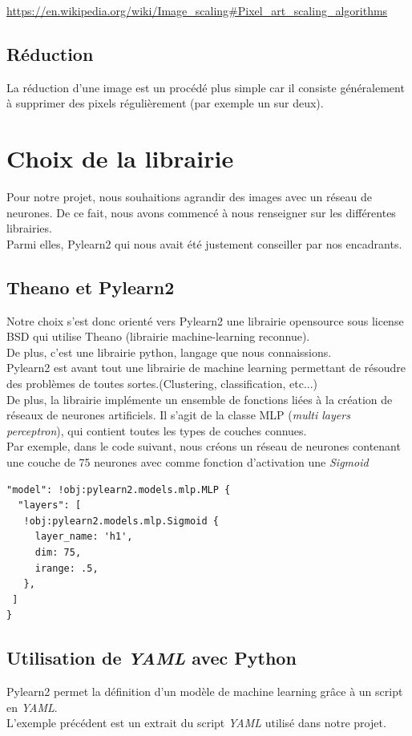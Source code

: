 \documentclass[12pt, a4paper]{article}
\begin{document}
\url{https://en.wikipedia.org/wiki/Image_scaling#Pixel_art_scaling_algorithms}

\subsection{Réduction}

La réduction d'une image est un procédé plus simple car il consiste généralement à supprimer des pixels régulièrement (par exemple un sur deux).


\section{Choix de la librairie}
Pour notre projet, nous souhaitions agrandir des images avec un réseau de neurones. De ce fait, nous avons commencé à nous renseigner sur les différentes librairies. \\ Parmi elles, Pylearn2 qui nous avait été justement conseiller par nos encadrants. 
\subsection{Theano et Pylearn2}
Notre choix s'est donc orienté vers Pylearn2 une librairie opensource sous license BSD qui utilise Theano (librairie machine-learning reconnue).
\\ De plus, c'est une librairie python, langage que nous connaissions.
\\

Pylearn2 est avant tout une librairie de machine learning permettant de résoudre des problèmes de toutes sortes.(Clustering, classification, etc...)
\\De plus, la librairie implémente un ensemble de fonctions liées à la création de réseaux de neurones artificiels. Il s'agit de la classe MLP (\emph{multi layers perceptron}), qui contient toutes les types de couches connues. \\ Par exemple, dans le code suivant, nous créons un réseau de neurones contenant une couche de 75 neurones avec comme fonction d'activation une \emph{Sigmoid}
\begin{verbatim}
"model": !obj:pylearn2.models.mlp.MLP {
  "layers": [
   !obj:pylearn2.models.mlp.Sigmoid {
     layer_name: 'h1',
     dim: 75,
     irange: .5,
   },
 ]
}
\end{verbatim}
\subsection{Utilisation de \emph{YAML} avec Python}
Pylearn2 permet la définition d'un modèle de machine learning grâce à un script en \emph{YAML}.\\ L'exemple précédent est un extrait du script \emph{YAML} utilisé dans notre projet. 
\\
\end{document}

